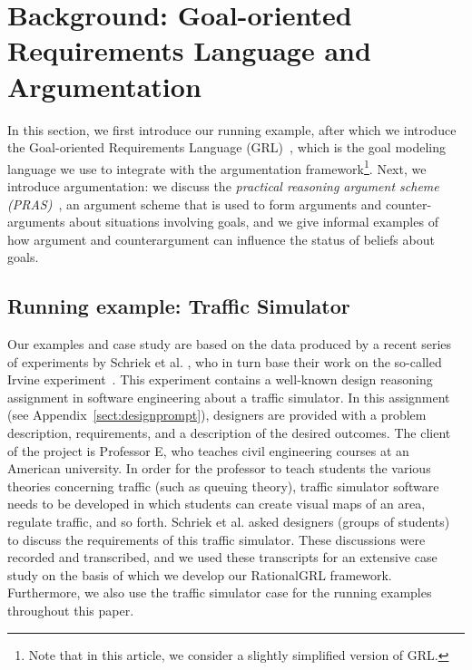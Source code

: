 \section{Background: Goal-oriented Requirements Language and Argumentation}
\label{sect:background}

In this section, we first introduce our running example, after which we introduce the Goal-oriented Requirements Language (GRL)~\cite{Amyot:2010:EGM:1841349.1841356}, which is the goal modeling language we use to integrate with the argumentation framework\footnote{Note that in this article, we consider a slightly simplified version of GRL.}. Next, we introduce argumentation: we discuss the \emph{practical reasoning argument scheme (PRAS)}~\cite{atkinson2007}, an argument scheme that is used to form arguments and counter-arguments about situations involving goals, and we give informal examples of how argument and counterargument can influence the status of beliefs about goals.   %

\subsection{Running example: Traffic Simulator}
\label{sect:goals:runningexample}

Our examples and case study are based on the data produced by a recent series of experiments by Schriek et al. \cite{SchriekEtal2016}, who in turn base their work on the so-called Irvine experiment~\cite{UCIworkshop}. This experiment contains a well-known design reasoning assignment in software engineering about a traffic simulator. In this assignment (see Appendix~\ref{sect:designprompt}), designers are provided with a problem description, requirements, and a description of the desired outcomes. The client of the project is Professor E, who teaches civil engineering courses at an American university. In order for the professor to teach students the various theories concerning traffic (such as queuing theory), traffic simulator software needs to be developed in which students can create visual maps of an area, regulate traffic, and so forth. Schriek et al. asked designers (groups of students) to discuss the requirements of this traffic simulator. These discussions were recorded and transcribed, and we used these transcripts for an extensive case study on the basis of which we develop our RationalGRL framework. Furthermore, we also use the traffic simulator case for the running examples throughout this paper. 

